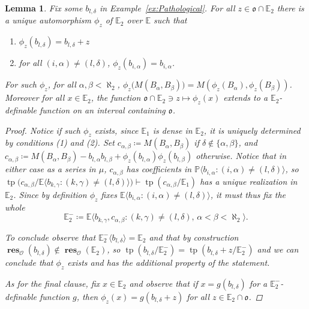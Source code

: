 \documentclass{amsart}
\newtheorem{lemma}[theorem]{Lemma}
\theoremstyle{remark}
\theoremstyle{definition}
\theoremstyle{plain}
\newcommand{\bE}{\mathbb E}
\newcommand{\bP}{\mathbb P}
\newcommand{\cO}{\mathcal O}
\newcommand{\co}{\mathfrak o}
\DeclareMathOperator{\res}{\mathbf{res}}
\DeclareMathOperator{\tp}{\mathrm{tp}}
\theoremstyle{plain}
\begin{document}
\begin{lemma}\label{lem:Example_auto}
    Fix some $b_{l, \delta}$ in Example~\ref{ex:Pathological}. For all $z \in \co \cap \bE_2$ there is a unique automorphism $\phi_z$ of $\bE_2$ over $\bE$ such that
    \begin{enumerate}
        \item $\phi_z(b_{l, \delta}) = b_{l, \delta}+ z$
        \item for all $(i,\alpha)\neq (l, \delta)$, $\phi_z(b_{i,\alpha})=b_{i,\alpha}$.
    \end{enumerate}
    For such $\phi_z$, for all $\alpha,\beta<\aleph_2$, $\phi_z\big(M(B_\alpha, B_\beta)\big)=M(\phi_z(B_\alpha), \phi_z(B_\beta))$. Moreover for all $x \in \bE_2$, the function $\co \cap \bE_2 \ni z \mapsto \phi_z(x)$ extends to a $\bE_2$-definable function on an interval containing $\co$.
    \begin{proof}
        Notice if such $\phi_z$ exists, since $\bE_1$ is dense in $\bE_2$, it is uniquely determined by conditions (1) and (2).
        Set $c_{\alpha,\beta}\coloneqq M(B_\alpha, B_\beta)$ if $\delta \notin \{\alpha,\beta\}$, and $c_{\alpha,\beta}\coloneqq M(B_\alpha, B_\beta)-b_{l, \alpha}b_{l,\beta}+\phi_z(b_{l,\alpha})\phi_z(b_{l,\beta})$ otherwise.
        Notice that in either case as a series in $\mu$, $c_{\alpha,\beta}$ has coefficients in $\bP\langle b_{i,\alpha}: (i,\alpha) \neq (l, \delta)\rangle$, so $\tp\big(c_{\alpha,\beta}/\bE \langle b_{k, \gamma}: (k,\gamma) \neq (l, \delta)\rangle\big)\vdash \tp(c_{\alpha,\beta}/\bE_1)$ has a unique realization in $\bE_2$. Since by definition $\phi_z$ fixes $\bE \langle b_{i,\alpha}: (i,\alpha) \neq (l,\delta)\rangle$, it must thus fix the whole
        \[\bE_2^{-}\coloneqq \bE\langle b_{k,\gamma}, c_{\alpha, \beta}: (k, \gamma) \neq (l, \delta), \, \alpha<\beta<\aleph_2\rangle.\]
        
        To conclude observe that $\bE_2^- \langle b_{l, \delta}\rangle = \bE_2$ and that by construction $\res_\cO(b_{l, \delta}) \notin \res_\cO(\bE_2)$, so $\tp(b_{l, \delta}/\bE_2^-)=\tp(b_{l, \delta}+z/\bE_2^-)$ and we can conclude that $\phi_z$ exists and has the additional property of the statement.

        As for the final clause, fix $x \in \bE_2$ and observe that if $x=g(b_{l, \delta})$ for a $\bE_2^-$-definable function $g$, then $\phi_z(x)=g(b_{l, \delta}+z)$ for all $z \in \bE_2\cap \co$.
    \end{proof}
\end{lemma}
\end{document}
